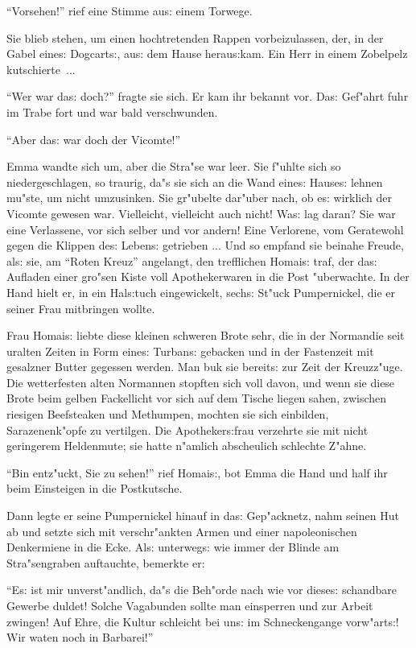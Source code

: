 \documentclass[oneside,12pt]{book}
\newcommand{\s}{s:}%
\begin{document}
"`Vorsehen!"' rief eine Stimme au{\s} einem Torwege.

Sie blieb stehen, um einen hochtretenden Rappen vorbeizulassen,
der, in der Gabel eine{\s} Dogcart{\s}, au{\s} dem Hause
herau{\s}kam. Ein Herr in einem Zobelpelz kutschierte~...

"`Wer war da{\s} doch?"' fragte sie sich. Er kam ihr bekannt vor.
Da{\s} Gef"ahrt fuhr im Trabe fort und war bald verschwunden.

"`Aber da{\s} war doch der Vicomte!"'

Emma wandte sich um, aber die Stra"se war leer. Sie f"uhlte sich
so niedergeschlagen, so traurig, da"s sie sich an die Wand
eine{\s} Hause{\s} lehnen mu"ste, um nicht umzusinken. Sie
gr"ubelte dar"uber nach, ob e{\s} wirklich der Vicomte gewesen
war. Vielleicht, vielleicht auch nicht! Wa{\s} lag daran? Sie war
eine Verlassene, vor sich selber und vor andern! Eine Verlorene,
vom Geratewohl gegen die Klippen de{\s} Leben{\s} getrieben ...
Und so empfand sie beinahe Freude, al{\s} sie, am "`Roten Kreuz"'
angelangt, den trefflichen Homai{\s} traf, der da{\s} Aufladen
einer gro"sen Kiste voll Apothekerwaren in die Post "uberwachte.
In der Hand hielt er, in ein Hal{\s}tuch eingewickelt, sech{\s}
St"uck Pumpernickel, die er seiner Frau mitbringen wollte.

Frau Homai{\s} liebte diese kleinen schweren Brote sehr, die in
der Normandie seit uralten Zeiten in Form eine{\s} Turban{\s}
gebacken und in der Fastenzeit mit gesalzner Butter gegessen
werden. Man buk sie bereit{\s} zur Zeit der Kreuzz"uge. Die
wetterfesten alten Normannen stopften sich voll davon, und wenn
sie diese Brote beim gelben Fackellicht vor sich auf dem Tische
liegen sahen, zwischen riesigen Beefsteaken und Methumpen, mochten
sie sich einbilden, Sarazenenk"opfe zu vertilgen. Die
Apotheker{\s}frau verzehrte sie mit nicht geringerem Heldenmute;
sie hatte n"amlich abscheulich schlechte Z"ahne.

"`Bin ent\/z"uckt, Sie zu sehen!"' rief Homai{\s}, bot Emma die Hand
und half ihr beim Einsteigen in die Postkutsche.

Dann legte er seine Pumpernickel hinauf in da{\s} Gep"acknetz,
nahm seinen Hut ab und setzte sich mit verschr"ankten Armen und
einer napoleonischen Denkermiene in die Ecke. Al{\s} unterweg{\s}
wie immer der Blinde am Stra"sengraben auftauchte, bemerkte er:

"`E{\s} ist mir unverst"andlich, da"s die Beh"orde nach wie vor
diese{\s} schandbare Gewerbe duldet! Solche Vagabunden sollte man
einsperren und zur Arbeit zwingen! Auf Ehre, die Kultur schleicht
bei un{\s} im Schneckengange vorw"art{\s}! Wir waten noch in
Barbarei!"'
\end{document}
